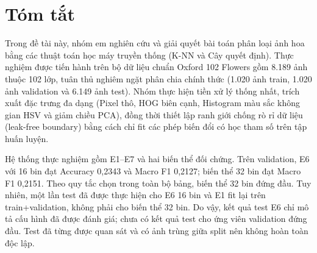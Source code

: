 \chapter*{Tóm tắt}
Trong đề tài này, nhóm em nghiên cứu và giải quyết bài toán phân loại ảnh hoa bằng các thuật toán học máy truyền thống (K-NN và Cây quyết định). Thực nghiệm được tiến hành trên bộ dữ liệu chuẩn Oxford 102 Flowers gồm 8.189 ảnh thuộc 102 lớp, tuân thủ nghiêm ngặt phân chia chính thức (1.020 ảnh train, 1.020 ảnh validation và 6.149 ảnh test). Nhóm thực hiện tiền xử lý thống nhất, trích xuất đặc trưng đa dạng (Pixel thô, HOG biên cạnh, Histogram màu sắc không gian HSV và giảm chiều PCA), đồng thời thiết lập ranh giới chống rò rỉ dữ liệu (leak-free boundary) bằng cách chỉ fit các phép biến đổi có học tham số trên tập huấn luyện.

Hệ thống thực nghiệm gồm E1–E7 và hai biến thể đối chứng. Trên validation, E6 với 16 bin đạt Accuracy 0,2343 và Macro F1 0,2127; biến thể 32 bin đạt Macro F1 0,2151. Theo quy tắc chọn trong toàn bộ bảng, biến thể 32 bin đứng đầu. Tuy nhiên, một lần test đã được thực hiện cho E6 16 bin và E1 fit lại trên train+validation, không phải cho biến thể 32 bin. Do vậy, kết quả test E6 chỉ mô tả cấu hình đã được đánh giá; chưa có kết quả test cho ứng viên validation đứng đầu. Test đã từng được quan sát và có ảnh trùng giữa split nên không hoàn toàn độc lập.
